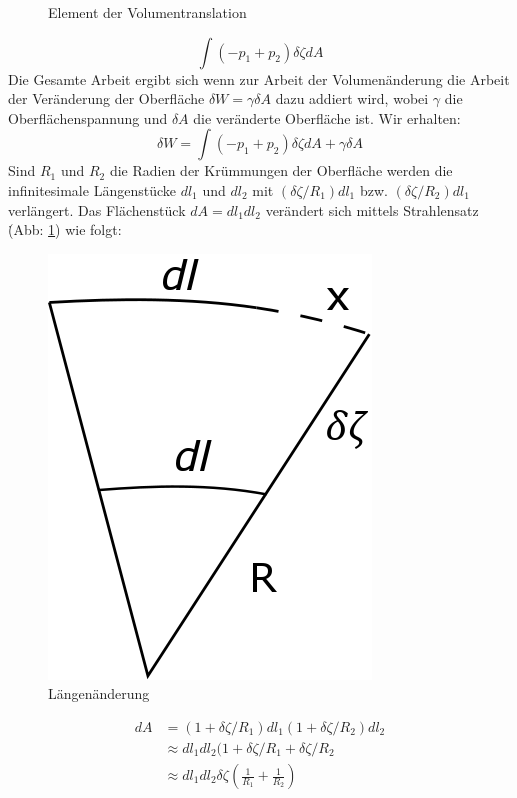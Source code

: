 \begin{refsection}
\begin{figure}
  \caption{Element der Volumentranslation} 
\end{figure}
\begin{equation}
\int(-p_1+p_2)\delta \zeta dA
\end{equation}
Die Gesamte Arbeit ergibt sich wenn zur Arbeit der Volumenänderung die Arbeit der Veränderung der Oberfläche $\delta W=\gamma \delta A $ dazu addiert wird, wobei $\gamma$ die Oberflächenspannung und $\delta A$ die veränderte Oberfläche ist. Wir erhalten:
\begin{equation}\label{YL-Arbeit_1}
\delta W=\int(-p_1+p_2)\delta\zeta dA + \gamma\delta A
\end{equation}
Sind $R_1$ und $R_2$ die Radien der Krümmungen der Oberfläche werden die infinitesimale Längenstücke $dl_1$ und $dl_2$ mit $(\delta\zeta /R_1)dl_1$ bzw. $(\delta\zeta /R_2)dl_1$ verlängert. Das Flächenstück $dA=dl_1 dl_2$ verändert sich mittels Strahlensatz \.(Abb: \ref{fig:Strahlensatz}) wie folgt:
\begin{figure}\label{fig:Strahlensatz}
  \centering
  \includegraphics[scale=0.3]{minimal/Langenanderung.png}
  \caption{Längenänderung} 
\end{figure}
\begin{equation}
\begin{split}
dA &= (1+\delta\zeta/R_1)dl_1 (1+\delta\zeta/R_2)dl_2 \\
&\approx dl_1 dl_2 (1+\delta\zeta/R_1 + \delta\zeta/R_2 \\
&\approx dl_1 dl_2 \delta\zeta (\frac{1}{R_1}+\frac{1}{R_2})

\end{split}
\end{equation}
\end{refsection}
